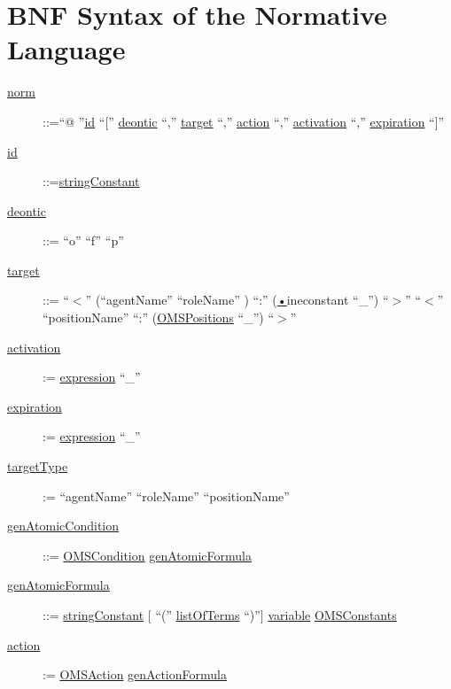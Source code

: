 \chapter{BNF Syntax of the Normative \\ Language}
\begin{description}
	\item[\underline{norm}] ::=``@ ''\underline{id} ``['' \underline{deontic} ``,'' \underline{target} ``,'' \underline{action} ``,'' \underline{activation} ``,'' \underline{expiration} ``]''
\item	[\underline{id}] ::=\underline{stringConstant}  

\item[\underline{deontic}] ::= ``o'' \textbar  ``f'' \textbar ``p''

\item[\underline{target}] ::= ``$<$'' (``agentName'' \textbar ``roleName'' ) ``:'' (\underline{•}ine{constant} \textbar ``\_'') ``$>$'' \textbar  ``$<$'' ``positionName''  ``:'' (\underline{OMSPositions} \textbar ``\_'') ``$>$''
\item[\underline{activation}]:= \underline{expression}  \textbar ``\_''

\item[\underline{expiration}]:= \underline{expression}  \textbar ``\_''

\item[\underline{targetType}]:= ``agentName'' \textbar ``roleName'' \textbar ``positionName''


\item[\underline{genAtomicCondition}] ::= \underline{OMSCondition} \textbar \underline{genAtomicFormula}

\item[\underline{genAtomicFormula}]::= \underline{stringConstant}  $[$ ``('' \underline{listOfTerms} ``)''$]$   \textbar \underline{variable}  \textbar \underline{OMSConstants}


\item[\underline{action}] := \underline{OMSAction} \textbar \underline{genActionFormula}


\end{description}
